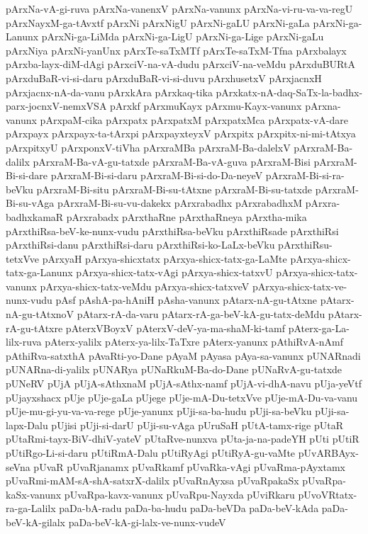 {pArxNa-vA-gi-ruva
pArxNa-vanenxV
pArxNa-vanunx
pArxNa-vi-ru-va-va-regU
pArxNayxM-ga-tAvxtf
pArxNi
pArxNigU
pArxNi-gaLU
pArxNi-gaLa
pArxNi-ga-Lanunx
pArxNi-ga-LiMda
pArxNi-ga-LigU
pArxNi-ga-Lige
pArxNi-gaLu
pArxNiya
pArxNi-yanUnx
pArxTe-saTxMTf
pArxTe-saTxM-Tfna
pArxbalayx
pArxba-layx-diM-dAgi
pArxciV-na-vA-dudu
pArxciV-na-veMdu
pArxduBURtA
pArxduBaR-vi-si-daru
pArxduBaR-vi-si-duvu
pArxhusetxV
pArxjacnxH
pArxjacnx-nA-da-vanu
pArxkAra
pArxkaq-tika
pArxkatx-nA-daq-SaTx-la-badhx-parx-jocnxV-nemxVSA
pArxkf
pArxmuKayx
pArxmu-Kayx-vanunx
pArxna-vanunx
pArxpaM-cika
pArxpatx
pArxpatxM
pArxpatxMca
pArxpatx-vA-dare
pArxpayx
pArxpayx-ta-tArxpi
pArxpayxteyxV
pArxpitx
pArxpitx-ni-mi-tAtxya
pArxpitxyU
pArxponxV-tiVha
pArxraMBa
pArxraM-Ba-dalelxV
pArxraM-Ba-dalilx
pArxraM-Ba-vA-gu-tatxde
pArxraM-Ba-vA-guva
pArxraM-Bisi
pArxraM-Bi-si-dare
pArxraM-Bi-si-daru
pArxraM-Bi-si-do-Da-neyeV
pArxraM-Bi-si-ra-beVku
pArxraM-Bi-situ
pArxraM-Bi-su-tAtxne
pArxraM-Bi-su-tatxde
pArxraM-Bi-su-vAga
pArxraM-Bi-su-vu-dakekx
pArxrabadhx
pArxrabadhxM
pArxra-badhxkamaR
pArxrabadx
pArxthaRne
pArxthaRneya
pArxtha-mika
pArxthiRsa-beV-ke-nunx-vudu
pArxthiRsa-beVku
pArxthiRsade
pArxthiRsi
pArxthiRsi-danu
pArxthiRsi-daru
pArxthiRsi-ko-LaLx-beVku
pArxthiRsu-tetxVve
pArxyaH
pArxya-shicxtatx
pArxya-shicx-tatx-ga-LaMte
pArxya-shicx-tatx-ga-Lanunx
pArxya-shicx-tatx-vAgi
pArxya-shicx-tatxvU
pArxya-shicx-tatx-vanunx
pArxya-shicx-tatx-veMdu
pArxya-shicx-tatxveV
pArxya-shicx-tatx-ve-nunx-vudu
pAsf
pAshA-pa-hAniH
pAsha-vanunx
pAtarx-nA-gu-tAtxne
pAtarx-nA-gu-tAtxnoV
pAtarx-rA-da-varu
pAtarx-rA-ga-beV-kA-gu-tatx-deMdu
pAtarx-rA-gu-tAtxre
pAterxVBoyxV
pAterxV-deV-ya-ma-shaM-ki-tamf
pAterx-ga-La-lilx-ruva
pAterx-yalilx
pAterx-ya-lilx-TaTxre
pAterx-yanunx
pAthiRvA-nAmf
pAthiRva-satxthA
pAvaRti-yo-Dane
pAyaM
pAyasa
pAya-sa-vanunx
pUNARnadi
pUNARna-di-yalilx
pUNARya
pUNaRkuM-Ba-do-Dane
pUNaRvA-gu-tatxde
pUNeRV
pUjA
pUjA-sAthxnaM
pUjA-sAthx-namf
pUjA-vi-dhA-navu
pUja-yeVtf
pUjayxshacx
pUje
pUje-gaLa
pUjege
pUje-mA-Du-tetxVve
pUje-mA-Du-va-vanu
pUje-mu-gi-yu-va-va-rege
pUje-yanunx
pUji-sa-ba-hudu
pUji-sa-beVku
pUji-sa-lapx-Dalu
pUjisi
pUji-si-darU
pUji-su-vAga
pUruSaH
pUtA-tamx-rige
pUtaR
pUtaRmi-tayx-BiV-dhiV-yateV
pUtaRve-nunxva
pUta-ja-na-padeYH
pUti
pUtiR
pUtiRgo-Li-si-daru
pUtiRmA-Dalu
pUtiRyAgi
pUtiRyA-gu-vaMte
pUvARBAyx-seVna
pUvaR
pUvaRjanamx
pUvaRkamf
pUvaRka-vAgi
pUvaRma-pAyxtamx
pUvaRmi-mAM-sA-shA-satxrX-dalilx
pUvaRnAyxsa
pUvaRpakaSx
pUvaRpa-kaSx-vanunx
pUvaRpa-kavx-vanunx
pUvaRpu-Nayxda
pUviRkaru
pUvoVRtatx-ra-ga-Lalilx
paDa-bA-radu
paDa-ba-hudu
paDa-beVDa
paDa-beV-kAda
paDa-beV-kA-gilalx
paDa-beV-kA-gi-lalx-ve-nunx-vudeV
}
